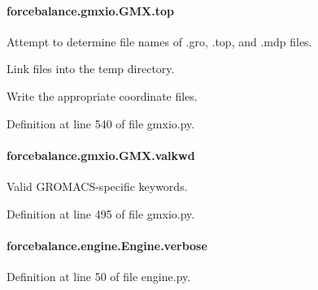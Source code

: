 \hypertarget{classforcebalance_1_1gmxio_1_1GMX_acdd7f2bbbdbb41c9abcfafb1c22751fe}{
\paragraph[{top}]{\setlength{\rightskip}{0pt plus 5cm}forcebalance.\-gmxio.\-G\-M\-X.\-top}}\label{classforcebalance_1_1gmxio_1_1GMX_acdd7f2bbbdbb41c9abcfafb1c22751fe}


Attempt to determine file names of .gro, .top, and .mdp files. 

Link files into the temp directory.

Write the appropriate coordinate files. 

Definition at line 540 of file gmxio.\-py.

\hypertarget{classforcebalance_1_1gmxio_1_1GMX_a8f70871633074667e271e865f2f54b41}{
\paragraph[{valkwd}]{\setlength{\rightskip}{0pt plus 5cm}forcebalance.\-gmxio.\-G\-M\-X.\-valkwd}}\label{classforcebalance_1_1gmxio_1_1GMX_a8f70871633074667e271e865f2f54b41}


Valid G\-R\-O\-M\-A\-C\-S-\/specific keywords. 



Definition at line 495 of file gmxio.\-py.

\hypertarget{classforcebalance_1_1engine_1_1Engine_a29b97ebf8984e50fd19eb831715ab659}{
\paragraph[{verbose}]{\setlength{\rightskip}{0pt plus 5cm}forcebalance.\-engine.\-Engine.\-verbose\hspace{0.3cm}{\ttfamily [inherited]}}}\label{classforcebalance_1_1engine_1_1Engine_a29b97ebf8984e50fd19eb831715ab659}


Definition at line 50 of file engine.\-py.

